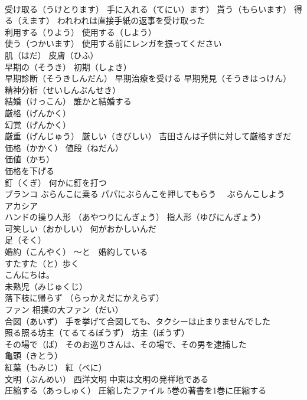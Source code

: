 \documentclass[8pt]{extreport}
\begin{document}
\begin{CJK}{UTF8}{min}
\\	受け取る（うけとります） 手に入れる（てにい）ます） 貰う（もらいます） 得る（えます） われわれは直接手紙の返事を受け取った
\\	利用する（りよう） 使用する（しよう） 
\\	使う（つかいます） 使用する前にレンガを振ってください
\\	肌（はだ） 皮膚（ひふ）
\\	早期の（そうき） 初期（しょき）
\\	早期診断（そうきしんだん） 早期治療を受ける 早期発見（そうきはっけん）
\\	精神分析（せいしんぶんせき）
\\	結婚（けっこん） 誰かと結婚する
\\	厳格（げんかく）
\\	幻覚（げんかく） 
\\	厳重（げんじゅう） 厳しい（きびしい） 吉田さんは子供に対して厳格すぎだ
\\	価格（かかく） 値段（ねだん）
\\	価値（かち）
\\	価格を下げる
\\	釘（くぎ） 何かに釘を打つ
\\	ブランコ ぶらんこに乗る パパにぶらんこを押してもらう　 ぶらんこしよう
\\	アカシア
\\	ハンドの操り人形 （あやつりにんぎょう） 指人形（ゆびにんぎょう）
\\	可笑しい（おかしい） 何がおかしいんだ
\\	足（そく）
\\	婚約（こんやく） ～と　婚約している
\\	すたすた（と）歩く
\\	こんにちは。
\\	未熟児（みじゅくじ）
\\	落下枝に帰らず （らっかえだにかえらず）
\\	ファン 相撲の大ファン（だい）
\\	合図（あいず） 手を挙げて合図しても、タクシーは止まりませんでした
\\	照る照る坊主（てるてるぼうず） 坊主（ぼうず）
\\	その場で（ば） そのお巡りさんは、その場で、その男を逮捕した
\\	亀頭（きとう）
\\	紅葉（もみじ） 紅（べに）
\\	文明（ぶんめい） 西洋文明 中東は文明の発祥地である
\\	圧縮する（あっしゅく） 圧縮したファイル 5巻の著書を1巻に圧縮する

\end{CJK}
\end{document}
